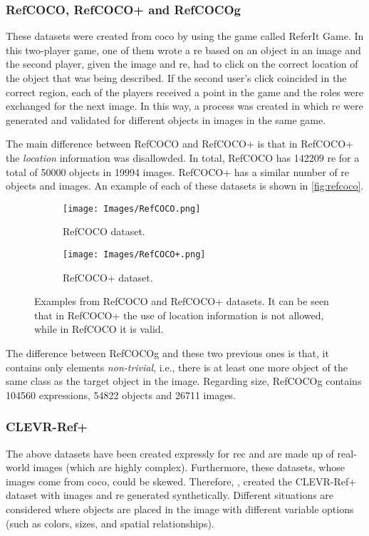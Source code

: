 \subsubsection{RefCOCO, RefCOCO+ and RefCOCOg}
These datasets were created from \gls{coco} by 
using the game called ReferIt Game. In this two-player game, one of them wrote
a \gls{re} based on an object in an image and the second player, given the
image and \gls{re}, had to click on the correct location of the object that was
being described. If the second user's click coincided in the correct region,
each of the players received a point in the game and the roles were exchanged
for the next image. In this way, a process was created in which \gls{re} were
generated and validated for different objects in images in the same game.

The main difference between RefCOCO and RefCOCO+ is that in RefCOCO+ the
\emph{location} information was disallowded. In total, RefCOCO has \num{142209}
\gls{re} for a total of \num{50000} objects in \num{19994} images. RefCOCO+ has
a similar number of \gls{re} objects and images. An example of each of these
datasets is shown in \vref{fig:refcoco}.

\begin{figure}[htb]
  \centering
  \begin{subfigure}[t]{.45\textwidth}
    \centering
    \caption{RefCOCO dataset.}
    \texttt{[image: Images/RefCOCO.png]}
  \end{subfigure}
  \begin{subfigure}[t]{.45\textwidth}
    \centering
    \caption{RefCOCO+ dataset.}
    \texttt{[image: Images/RefCOCO+.png]}
  \end{subfigure}
  \caption[Examples from RefCOCO and RefCOCO+ datasets]{Examples from RefCOCO
    and RefCOCO+ datasets. It can be seen that in RefCOCO+ the use of location
    information is not allowed, while in RefCOCO it is valid.}
  \label{fig:refcoco}
\end{figure}

The difference between RefCOCOg and these two previous ones is that, it
contains only elements \emph{non-trivial}, i.e., there is at least one more
object of the same class as the target object in the image. Regarding size,
RefCOCOg contains \num{104560} expressions, \num{54822} objects and \num{26711}
images.

\subsubsection{CLEVR-Ref+}
The above datasets have been created expressly for \gls{rec} and are made up of
real-world images (which are highly complex). Furthermore, these datasets,
whose images come from \gls{coco}, could be skewed. Therefore,
, created the CLEVR-Ref+ dataset with images and \gls{re}
generated synthetically. Different situations are considered where objects are
placed in the image with different variable options (such as colors, sizes, and
spatial relationships).

